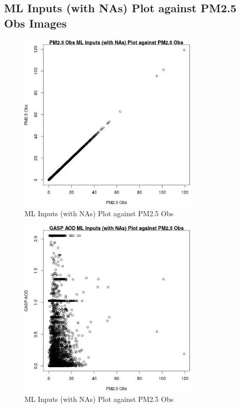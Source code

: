 
\subsection{ML Inputs (with NAs) Plot against PM2.5 Obs Images} 
 

\begin{figure} 
\centering  
\includegraphics[width=0.77\textwidth]{Code_Outputs/Report_ML_input_PM25_Step4_part_e_de_duplicated_aves_compiled_2019-05-18wNAs_PM25_ObsvPM25_Obs.jpg} 
\caption{\label{fig:Report_ML_input_PM25_Step4_part_e_de_duplicated_aves_compiled_2019-05-18wNAsPM25_ObsvPM25_Obs}ML Inputs (with NAs) Plot against PM2.5 Obs} 
\end{figure} 
 

\begin{figure} 
\centering  
\includegraphics[width=0.77\textwidth]{Code_Outputs/Report_ML_input_PM25_Step4_part_e_de_duplicated_aves_compiled_2019-05-18wNAs_GASP_AODvPM25_Obs.jpg} 
\caption{\label{fig:Report_ML_input_PM25_Step4_part_e_de_duplicated_aves_compiled_2019-05-18wNAsGASP_AODvPM25_Obs}ML Inputs (with NAs) Plot against PM2.5 Obs} 
\end{figure} 
 

